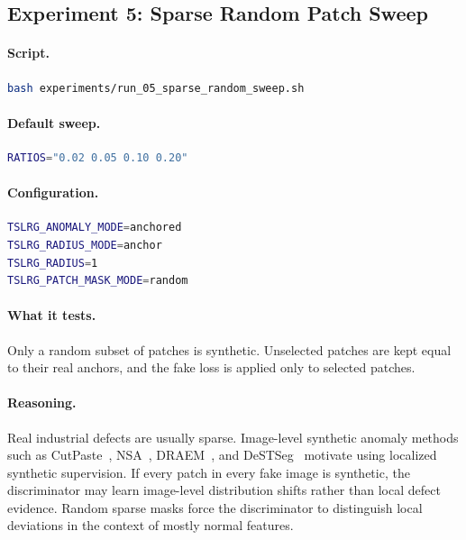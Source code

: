 \documentclass[11pt]{article}
\begin{document}
\subsection{Experiment 5: Sparse Random Patch Sweep}

\paragraph{Script.}
\begin{lstlisting}[language=bash]
bash experiments/run_05_sparse_random_sweep.sh
\end{lstlisting}

\paragraph{Default sweep.}
\begin{lstlisting}[language=bash]
RATIOS="0.02 0.05 0.10 0.20"
\end{lstlisting}

\paragraph{Configuration.}
\begin{lstlisting}[language=bash]
TSLRG_ANOMALY_MODE=anchored
TSLRG_RADIUS_MODE=anchor
TSLRG_RADIUS=1
TSLRG_PATCH_MASK_MODE=random
\end{lstlisting}

\paragraph{What it tests.}
Only a random subset of patches is synthetic. Unselected patches are kept equal
to their real anchors, and the fake loss is applied only to selected patches.

\paragraph{Reasoning.}
Real industrial defects are usually sparse. Image-level synthetic anomaly methods
such as CutPaste~\cite{cutpaste}, NSA~\cite{nsa}, DRAEM~\cite{draem}, and
DeSTSeg~\cite{destseg} motivate using localized synthetic supervision. If every
patch in every fake image is
synthetic, the discriminator may learn image-level distribution shifts rather
than local defect evidence. Random sparse masks force the discriminator to
distinguish local deviations in the context of mostly normal features.
\end{document}
